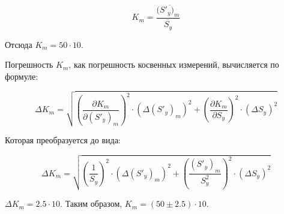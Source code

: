 \begin{equation}
\label{eq:7}
   K_m=\frac{(\overline{S'_y)_m}}{\overline{S_y}}
\end{equation}

Отсюда $K_m=50 \cdot 10$.

Погрешность $K_m$, как погрешность косвенных измерений, вычисляется по формуле:

\begin{equation}
\label{eq:8}
   \Delta K_m = \sqrt{\left(\frac{\partial K_m}{\partial (S'_y)_m}\right)^2 \cdot (\Delta(S'_y)_m)^2 + \left(\frac{\partial K_m}{\partial S_y}\right)^2 \cdot (\Delta S_y)^2}
\end{equation}

Которая преобразуется до вида:

\begin{equation}
\label{eq:9}
  \Delta K_m = \sqrt{\left(\frac{1}{S_y}\right)^2 \cdot (\Delta(S'_y)_m)^2 + \left(\frac{(S'_y)_m}{S_y^2}\right)^2 \cdot (\Delta S_y)^2}
\end{equation}

$\Delta K_m = 2.5 \cdot 10$. Таким образом, $K_m = (50 \pm 2.5)  \cdot 10$.

